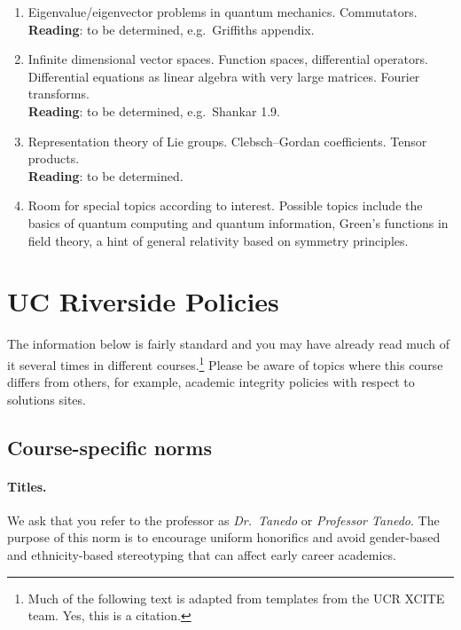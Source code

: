 \documentclass[12pt]{article}
\newcommand\acro[1]{{\small {#1}}}
\numberwithin{equation}{section}    %
\begin{document}
\begin{enumerate}
	\item %
	Eigenvalue/eigenvector problems in quantum mechanics. Commutators.
	\\
	\textsf{\small 
		\textbf{Reading}: to be determined, e.g.~Griffiths appendix.
	}

	\item %
	Infinite dimensional vector spaces. Function spaces, differential operators. Differential equations as linear algebra with very large matrices. Fourier transforms.
	\\
	\textsf{\small 
		\textbf{Reading}: to be determined, e.g.~Shankar 1.9.
	} 

	\item %
	Representation theory of Lie groups. Clebsch--Gordan coefficients. Tensor products.
	\\
	\textsf{\small 
		\textbf{Reading}: to be determined.
	} 

	\item Room for special topics according to interest. Possible topics include the basics of quantum computing and quantum information, Green's functions in field theory, a hint of general relativity based on symmetry principles.
\end{enumerate}






\section{UC Riverside Policies}

The information below is fairly standard and you may have already read much of it several times in different courses.\footnote{Much of the following text is adapted from templates from the \acro{UCR XCITE} team. Yes, this is a citation.} Please be aware of topics where this course differs from others, for example, academic integrity policies with respect to solutions sites. 

\subsection{Course-specific norms}

\paragraph{Titles.} We ask that you refer to the professor as \emph{Dr.~Tanedo} or \emph{Professor Tanedo}. The purpose of this norm is to encourage uniform honorifics and avoid gender-based and ethnicity-based stereotyping that can affect early career academics.
\end{document}

